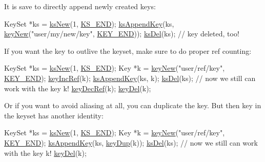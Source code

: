 It is save to directly append newly created keys\+: 
\begin{DoxyCodeInclude}
KeySet *ks = \hyperlink{group__keyset_ga671e1aaee3ae9dc13b4834a4ddbd2c3c}{ksNew}(1, \hyperlink{kdbenum_8c_a7a28fce3773b2c873c94ac80b8b4cd54}{KS\_END});
\hyperlink{group__keyset_gaa5a1d467a4d71041edce68ea7748ce45}{ksAppendKey}(ks,
        \hyperlink{group__key_gad23c65b44bf48d773759e1f9a4d43b89}{keyNew}(\textcolor{stringliteral}{"user/my/new/key"}, \hyperlink{group__key_gga91fb3178848bd682000958089abbaf40aa8adb6fcb92dec58fb19410eacfdd403}{KEY\_END}));
\hyperlink{group__keyset_ga27e5c16473b02a422238c8d970db7ac8}{ksDel}(ks);
\textcolor{comment}{// key deleted, too!}
\end{DoxyCodeInclude}
 If you want the key to outlive the keyset, make sure to do proper ref counting\+: 
\begin{DoxyCodeInclude}
KeySet *ks = \hyperlink{group__keyset_ga671e1aaee3ae9dc13b4834a4ddbd2c3c}{ksNew}(1, \hyperlink{kdbenum_8c_a7a28fce3773b2c873c94ac80b8b4cd54}{KS\_END});
Key *k = \hyperlink{group__key_gad23c65b44bf48d773759e1f9a4d43b89}{keyNew}(\textcolor{stringliteral}{"user/ref/key"}, \hyperlink{group__key_gga91fb3178848bd682000958089abbaf40aa8adb6fcb92dec58fb19410eacfdd403}{KEY\_END});
\hyperlink{group__key_ga6970a6f254d67af7e39f8e469bb162f1}{keyIncRef}(k);
\hyperlink{group__keyset_gaa5a1d467a4d71041edce68ea7748ce45}{ksAppendKey}(ks, k);
\hyperlink{group__keyset_ga27e5c16473b02a422238c8d970db7ac8}{ksDel}(ks);
\textcolor{comment}{// now we still can work with the key k!}
\hyperlink{group__key_ga2c6433ca22109e4e141946057eccb283}{keyDecRef}(k);
\hyperlink{group__key_ga3df95bbc2494e3e6703ece5639be5bb1}{keyDel}(k);
\end{DoxyCodeInclude}
 Or if you want to avoid aliasing at all, you can duplicate the key. But then key in the keyset has another identity\+: 
\begin{DoxyCodeInclude}
KeySet *ks = \hyperlink{group__keyset_ga671e1aaee3ae9dc13b4834a4ddbd2c3c}{ksNew}(1, \hyperlink{kdbenum_8c_a7a28fce3773b2c873c94ac80b8b4cd54}{KS\_END});
Key *k = \hyperlink{group__key_gad23c65b44bf48d773759e1f9a4d43b89}{keyNew}(\textcolor{stringliteral}{"user/ref/key"}, \hyperlink{group__key_gga91fb3178848bd682000958089abbaf40aa8adb6fcb92dec58fb19410eacfdd403}{KEY\_END});
\hyperlink{group__keyset_gaa5a1d467a4d71041edce68ea7748ce45}{ksAppendKey}(ks, \hyperlink{group__key_gae6ec6a60cc4b8c1463fa08623d056ce3}{keyDup}(k));
\hyperlink{group__keyset_ga27e5c16473b02a422238c8d970db7ac8}{ksDel}(ks);
\textcolor{comment}{// now we still can work with the key k!}
\hyperlink{group__key_ga3df95bbc2494e3e6703ece5639be5bb1}{keyDel}(k);
\end{DoxyCodeInclude}


